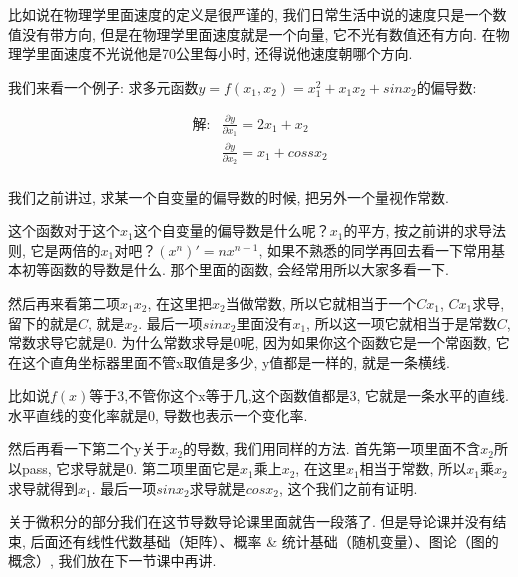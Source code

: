 比如说在物理学里面速度的定义是很严谨的, 我们日常生活中说的速度只是一个数值没有带方向, 但是在物理学里面速度就是一个向量, 它不光有数值还有方向. 在物理学里面速度不光说他是70公里每小时, 还得说他速度朝哪个方向. 

我们来看一个例子: 求多元函数$y=f(x_1, x_2)=x_1^2 + x_1x_2 + sinx_2$的偏导数:

\begin{align*}
  \mbox{解}: & \frac{\partial y}{\partial x_1}=2x_1+x_2 \\
& \frac{\partial y}{\partial x_2}=x_1+cossx_2 \\
\end{align*}

我们之前讲过, 求某一个自变量的偏导数的时候, 把另外一个量视作常数. 

这个函数对于这个$x_1$这个自变量的偏导数是什么呢？$x_1$的平方, 按之前讲的求导法则, 它是两倍的$x_1$对吧？$(x^n)'=nx^{n-1}$, 如果不熟悉的同学再回去看一下常用基本初等函数的导数是什么. 那个里面的函数, 会经常用所以大家多看一下. 

然后再来看第二项$x_1x_2$, 在这里把$x_2$当做常数, 所以它就相当于一个$Cx_1$, $Cx_1$求导, 留下的就是$C$, 就是$x_2$. 最后一项$sinx_2$里面没有$x_1$, 所以这一项它就相当于是常数$C$, 常数求导它就是0. 为什么常数求导是0呢, 因为如果你这个函数它是一个常函数, 它在这个直角坐标器里面不管x取值是多少, y值都是一样的, 就是一条横线. 

比如说$f(x)$等于3,不管你这个x等于几,这个函数值都是3, 它就是一条水平的直线. 水平直线的变化率就是0, 导数也表示一个变化率. 

然后再看一下第二个y关于$x_2$的导数, 我们用同样的方法. 首先第一项里面不含$x_2$所以pass, 它求导就是0. 第二项里面它是$x_1$乘上$x_2$, 在这里$x_1$相当于常数, 所以$x_1$乘$x_2$求导就得到$x_1$. 最后一项$sinx_2$求导就是$cosx_2$, 这个我们之前有证明. 

关于微积分的部分我们在这节导数导论课里面就告一段落了. 但是导论课并没有结束, 后面还有线性代数基础（矩阵）、概率 \& 统计基础（随机变量）、图论（图的概念）, 我们放在下一节课中再讲. 
